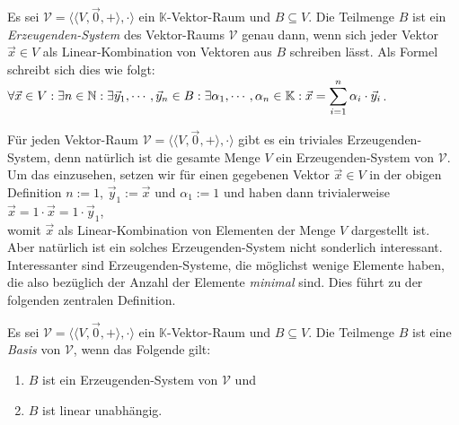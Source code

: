 \begin{Definition}
  Es sei $\mathcal{V} = \bigl\langle \langle V, \vec{0}, + \rangle, \cdot \bigr\rangle$ ein $\mathbb{K}$-Vektor-Raum 
  und $B \subseteq V$.  Die Teilmenge $B$ ist ein
  {\emph{\color{blue}Erzeugenden-System}} des Vektor-Raums $\mathcal{V}$ genau dann, wenn sich jeder Vektor 
  $\vec{x} \in V$ als Linear-Kombination von Vektoren aus $B$ schreiben l\"{a}sst. 
  Als Formel schreibt sich dies wie folgt:
  \\[0.2cm]
  \hspace*{1.3cm}
  $\displaystyle\forall \vec{x} \in V: \exists n \in \mathbb{N}: \exists  \vec{y}_1, \cdots,
  \vec{y}_n \in B: \exists \alpha_1, \cdots, \alpha_n \in \mathbb{K}: 
  \vec{x} = \sum\limits_{i=1}^n \alpha_i \cdot \vec{y}_i
  $. \eoxs
\end{Definition}

F\"{u}r jeden Vektor-Raum $\mathcal{V} = \bigl\langle \langle V, \vec{0}, + \rangle, \cdot \bigr\rangle$ 
gibt es ein triviales Erzeugenden-System, denn nat\"{u}rlich ist die gesamte 
Menge $V$ ein Erzeugenden-System von $\mathcal{V}$.  Um das einzusehen, setzen wir f\"{u}r einen gegebenen Vektor
$\vec{x} \in V$ in der obigen Definition $n:=1$, $\vec{y}_1 := \vec{x}$ und $\alpha_1 := 1$
und haben dann trivialerweise
\\[0.2cm]
\hspace*{1.3cm}
$\vec{x} = 1 \cdot \vec{x} = 1 \cdot \vec{y}_1$,
\\[0.2cm]
womit $\vec{x}$ als Linear-Kombination von Elementen der Menge $V$ dargestellt ist.  Aber
nat\"{u}rlich ist ein solches Erzeugenden-System nicht sonderlich interessant.  Interessanter sind
Erzeugenden-Systeme, die m\"{o}glichst wenige Elemente haben, die also bez\"{u}glich der Anzahl
der Elemente \emph{\color{blue}minimal} sind.  Dies f\"{u}hrt zu der folgenden zentralen Definition.

\begin{Definition}[Basis]
  Es sei $\mathcal{V} = \bigl\langle \langle V, \vec{0}, + \rangle, \cdot \bigr\rangle$ ein $\mathbb{K}$-Vektor-Raum 
  und $B \subseteq V$.  Die Teilmenge $B$ ist eine
  {\emph{\color{blue}Basis}} von $\mathcal{V}$, wenn das Folgende gilt:
  \begin{enumerate}
  \item $B$ ist ein Erzeugenden-System von $\mathcal{V}$ und
  \item $B$ ist linear unabh\"{a}ngig.  \eoxs
  \end{enumerate}
\end{Definition}

